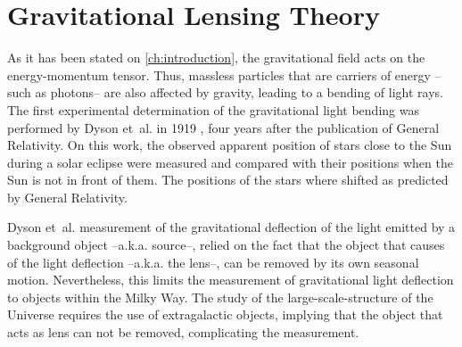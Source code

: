 \chapter{Gravitational Lensing Theory}
\label{ch:theory}
As it has been stated on \autoref{ch:introduction}, the gravitational field acts on the energy-momentum tensor. Thus, massless particles that are carriers of energy --such as photons-- are also affected by gravity, leading to a bending of light rays. The first experimental determination of the gravitational light bending was performed by Dyson et~al. in 1919 \cite{Dyson291}, four years after the publication of General Relativity. On this work, the observed apparent position of stars close to the Sun during a solar eclipse were measured and compared with their positions when the Sun is not in front of them. The positions of the stars where shifted as predicted by General Relativity.
\newline

Dyson et~al. measurement of the gravitational deflection of the light emitted by a background object --a.k.a. source--, relied on the fact that the object that causes of the light deflection --a.k.a. the lens--, can be removed by its own seasonal motion. Nevertheless, this limits the measurement of gravitational light deflection to objects within the Milky Way. The study of the large-scale-structure of the Universe requires the use of extragalactic objects, implying that the object that acts as lens can not be removed, complicating the measurement.
\newline

